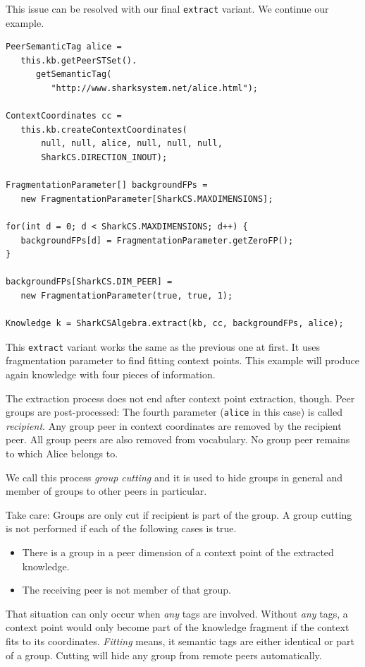 This issue can be resolved with our final {\tt extract} variant. We continue our example.

\begin{verbatim}
PeerSemanticTag alice = 
   this.kb.getPeerSTSet().
      getSemanticTag(
         "http://www.sharksystem.net/alice.html");

ContextCoordinates cc = 
   this.kb.createContextCoordinates(
       null, null, alice, null, null, null, 
       SharkCS.DIRECTION_INOUT);

FragmentationParameter[] backgroundFPs = 
   new FragmentationParameter[SharkCS.MAXDIMENSIONS];

for(int d = 0; d < SharkCS.MAXDIMENSIONS; d++) {
   backgroundFPs[d] = FragmentationParameter.getZeroFP();
}

backgroundFPs[SharkCS.DIM_PEER] = 
   new FragmentationParameter(true, true, 1);

Knowledge k = SharkCSAlgebra.extract(kb, cc, backgroundFPs, alice);
\end{verbatim}

This {\tt extract} variant works the same as the previous one at first. It uses fragmentation parameter to find fitting context points. This example will produce again knowledge with four pieces of information. 

The extraction process does not end after context point extraction, though. Peer groups are post-processed: The fourth parameter ({\tt alice} in this case) is called {\it recipient}. Any group peer in context coordinates are removed by the recipient peer. All group peers are also removed from vocabulary. No group peer remains to which Alice belongs to.

We call this process {\it group cutting} and it is used to hide groups in general and member of groups to other peers in particular.

Take care: Groups are only cut if recipient is part of the group. A group cutting is not performed if each of the following cases is true.

\begin{itemize}
\item 
There is a group in a peer dimension of a context point of the extracted knowledge.

\item 
The receiving peer is not member of that group.
\end{itemize}

That situation can only occur when {\it any} tags are involved. Without {\it any} tags, a context point would only become part of the knowledge fragment if the context fits to its coordinates. {\it Fitting} means, it semantic tags are either identical or part of a group. Cutting will hide any group from remote peers automatically.

